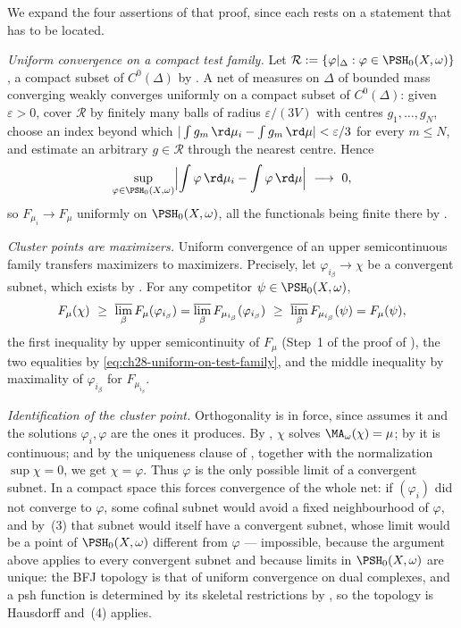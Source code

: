 We expand the four assertions of that proof, since each rests on a statement
that has to be located.

\emph{Uniform convergence on a compact test family.}  Let
$\mathcal R:=\{\varphi|_\Delta:\varphi\in\PSH_0(X,\omega)\}$, a compact
subset of $C^0(\Delta)$ by .  A net of
measures on $\Delta$ of bounded mass converging weakly converges uniformly
on a compact subset of $C^0(\Delta)$: given $\varepsilon>0$, cover
$\mathcal R$ by finitely many balls of radius $\varepsilon/(3V)$ with
centres $g_1,\ldots,g_N$, choose an index beyond which
$|\int g_m\,\rd\mu_i-\int g_m\,\rd\mu|<\varepsilon/3$ for every
$m\leq N$, and estimate an arbitrary $g\in\mathcal R$ through the
nearest centre.  Hence
\begin{equation}
\label{eq:ch28-uniform-on-test-family}
 \sup_{\varphi\in\PSH_0(X,\omega)}
 \Bigl|\int\varphi\,\rd\mu_i-\int\varphi\,\rd\mu\Bigr|
 \ \longrightarrow\ 0 ,
\end{equation}
so $F_{\mu_i}\to F_\mu$ uniformly on $\PSH_0(X,\omega)$, all the
functionals being finite there by .

\emph{Cluster points are maximizers.}  Uniform convergence of an upper
semicontinuous family transfers maximizers to maximizers.  Precisely, let
$\varphi_{i_\beta}\to\chi$ be a convergent subnet, which exists by
.  For any competitor
$\psi\in\PSH_0(X,\omega)$,
\[
 F_\mu(\chi)\ \geq\ \varlimsup_\beta F_{\mu}(\varphi_{i_\beta})
 =\varlimsup_\beta F_{\mu_{i_\beta}}(\varphi_{i_\beta})
 \ \geq\ \varlimsup_\beta F_{\mu_{i_\beta}}(\psi)=F_\mu(\psi),
\]
the first inequality by upper semicontinuity of $F_\mu$
(Step~1 of the proof of ), the two
equalities by \eqref{eq:ch28-uniform-on-test-family}, and the middle
inequality by maximality of $\varphi_{i_\beta}$ for $F_{\mu_{i_\beta}}$.

\emph{Identification of the cluster point.}  Orthogonality is in force,
since  assumes it and the solutions
$\varphi_i,\varphi$ are the ones it produces.  By
, $\chi$ solves
$\MA_\omega(\chi)=\mu$; by  it is
continuous; and by the uniqueness clause of
, together with the normalization
$\sup\chi=0$, we get $\chi=\varphi$.  Thus $\varphi$ is the only
possible limit of a convergent subnet.  In a compact space this forces
convergence of the whole net: if $(\varphi_i)$ did not converge to
$\varphi$, some cofinal subnet would avoid a fixed neighbourhood of
$\varphi$, and by \,(3) that subnet would itself
have a convergent subnet, whose limit would be a point of
$\PSH_0(X,\omega)$ different from $\varphi$ --- impossible, because the
argument above applies to every convergent subnet and because limits in
$\PSH_0(X,\omega)$ are unique: the BFJ topology is that of uniform
convergence on dual complexes, and a psh function is determined by its
skeletal restrictions by , so the
topology is Hausdorff and \,(4) applies.

